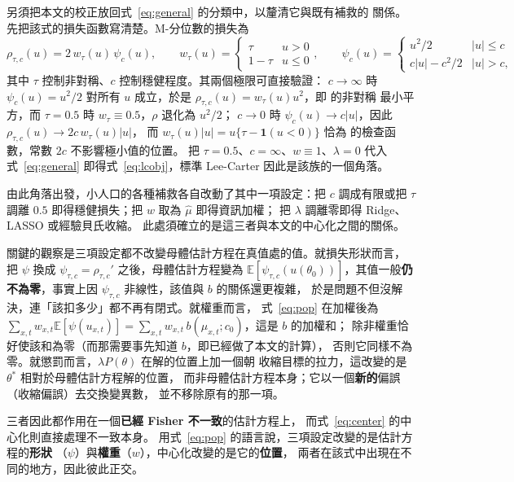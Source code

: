 \documentclass[UTF8, fontset=macnew, a4paper, 12pt]{ctexart}
\newcommand{\Ex}{\mathbb{E}}
\begin{document}
另須把本文的校正放回式~\eqref{eq:general} 的分類中，以釐清它與既有補救的
關係。先把該式的損失函數寫清楚。M-分位數的損失為
\begin{equation}\label{eq:mq}
\rho_{\tau,c}(u)=2\,w_\tau(u)\,\psi_c(u),\qquad
w_\tau(u)=\begin{cases}\tau & u>0\\ 1-\tau & u\le 0\end{cases},\qquad
\psi_c(u)=\begin{cases}u^2/2 & |u|\le c\\ c|u|-c^2/2 & |u|>c,\end{cases}
\end{equation}
其中 $\tau$ 控制非對稱、$c$ 控制穩健程度。其兩個極限可直接驗證：
$c\to\infty$ 時 $\psi_c(u)=u^2/2$ 對所有 $u$ 成立，於是
$\rho_{\tau,c}(u)=w_\tau(u)u^2$，即 \citet{newey1987}的非對稱
最小平方，而 $\tau=0.5$ 時 $w_\tau\equiv0.5$，$\rho$ 退化為 $u^2/2$；
$c\to0$ 時 $\psi_c(u)\to c|u|$，因此 $\rho_{\tau,c}(u)\to 2c\,w_\tau(u)|u|$，
而 $w_\tau(u)|u|=u\{\tau-\mathbf{1}(u<0)\}$ 恰為 \citet{koenker1978}
的檢查函數，常數 $2c$ 不影響極小值的位置。
把 $\tau=0.5$、$c=\infty$、$w\equiv1$、$\lambda=0$ 代入式~\eqref{eq:general}
即得式~\eqref{eq:lcobj}，標準 Lee-Carter 因此是該族的一個角落。

由此角落出發，小人口的各種補救各自改動了其中一項設定：把 $c$ 調成有限或把
$\tau$ 調離 $0.5$ 即得穩健損失；把 $w$ 取為 $\hat\mu$ 即得資訊加權；
把 $\lambda$ 調離零即得 Ridge、LASSO 或經驗貝氏收縮。
此處須確立的是這三者與本文的中心化之間的關係。

關鍵的觀察是三項設定都不改變母體估計方程在真值處的值。就損失形狀而言，
把 $\psi$ 換成 $\psi_{\tau,c}=\rho_{\tau,c}'$ 之後，母體估計方程變為
$\Ex[\psi_{\tau,c}(u(\theta_0))]$，其值一般\textbf{仍不為零}，事實上因 $\psi_{\tau,c}$ 非線性，該值與 $b$ 的關係還更複雜，
於是問題不但沒解決，連「該扣多少」都不再有閉式。就權重而言，
式~\eqref{eq:pop} 在加權後為 $\sum_{x,t}w_{x,t}\Ex[\psi(u_{x,t})]=
\sum_{x,t}w_{x,t}\,b(\mu_{x,t};c_0)$，這是 $b$ 的加權和；
除非權重恰好使該和為零（而那需要事先知道 $b$，即已經做了本文的計算），
否則它同樣不為零。就懲罰而言，$\lambda P(\theta)$ 在解的位置上加一個朝
收縮目標的拉力，這改變的是 $\theta^{\ast}$ 相對於母體估計方程解的位置，
而非母體估計方程本身；它以一個\textbf{新的}偏誤（收縮偏誤）去交換變異數，
並不移除原有的那一項。

三者因此都作用在一個\textbf{已經 Fisher 不一致}的估計方程上，
而式~\eqref{eq:center} 的中心化則直接處理不一致本身。
用式~\eqref{eq:pop} 的語言說，三項設定改變的是估計方程的\textbf{形狀}
（$\psi$）與\textbf{權重}（$w$），中心化改變的是它的\textbf{位置}，
兩者在該式中出現在不同的地方，因此彼此正交。
\end{document}
